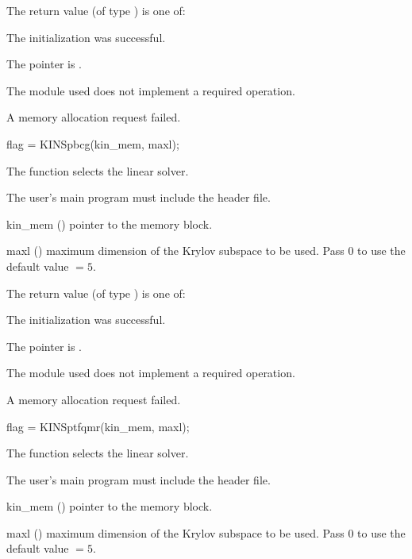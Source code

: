 {
  The return value  (of type ) is one of:
  \begin{args}
  \item[\Id{KINSPILS\_SUCCESS}] 
    The {\kinspgmr} initialization was successful.
  \item[\Id{KINSPILS\_MEM\_NULL}]
    The  pointer is .
  \item[\Id{KINSPILS\_ILL\_INPUT}]
    The {\nvector} module used does not implement a required operation.
  \item[\Id{KINSPILS\_MEM\_FAIL}]
    A memory allocation request failed.
  \end{args}
}
{}
{
  flag = KINSpbcg(kin\_mem, maxl);
}
{
  The function  selects the {\kinspbcg} linear solver.

  The user's main program must include the  header file.
}
{
  \begin{args}
  \item[kin\_mem] ()
    pointer to the {\kinsol} memory block.
  \item[maxl] ()
    maximum dimension of the Krylov subspace to be used. Pass $0$ to use the 
    default value $=5$.
  \end{args}
}
{
  The return value  (of type ) is one of:
  \begin{args}
  \item[\Id{KINSPILS\_SUCCESS}] 
    The {\kinspbcg} initialization was successful.
  \item[\Id{KINSPILS\_MEM\_NULL}]
    The  pointer is .
  \item[\Id{KINSPILS\_ILL\_INPUT}]
    The {\nvector} module used does not implement a required operation.
  \item[\Id{KINSPILS\_MEM\_FAIL}]
    A memory allocation request failed.
  \end{args}
}
{}
{
  flag = KINSptfqmr(kin\_mem, maxl);
}
{
  The function  selects the {\kinsptfqmr} linear solver.

  The user's main program must include the  header file.
}
{
  \begin{args}
  \item[kin\_mem] ()
    pointer to the {\kinsol} memory block.
  \item[maxl] ()
    maximum dimension of the Krylov subspace to be used. Pass $0$ to use the 
    default value $=5$.
  \end{args}
}
